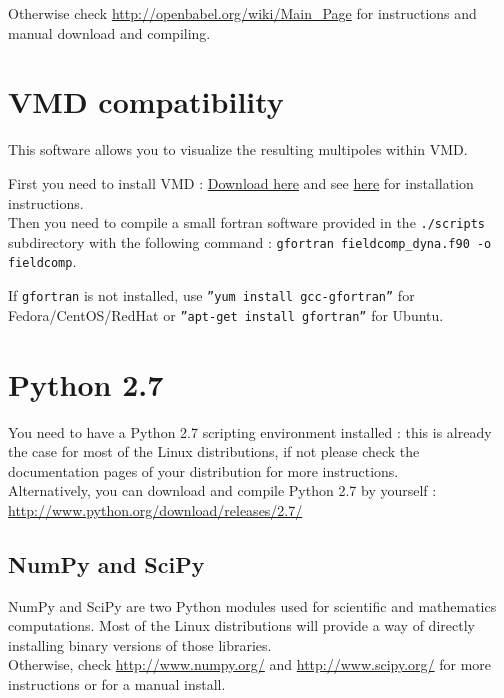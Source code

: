 \documentclass[11pt,a4paper]{article}
\begin{document}
Otherwise check 
\href{http://openbabel.org/wiki/Main_Page}{http://openbabel.org/wiki/Main\_Page}
 for instructions and manual download and compiling.

\section{VMD compatibility}
This software allows you to visualize the resulting multipoles within VMD.

First you need to install VMD : 
\href{http://www.ks.uiuc.edu/Development/Download/download.cgi?PackageName=VMD}{Download
 here} and see 
\href{http://www.ks.uiuc.edu/Research/vmd/current/docs.html}{here} for 
installation instructions.\\

Then you need to compile a small fortran software provided in the 
\texttt{./scripts} subdirectory with the following command : 
\texttt{gfortran fieldcomp\_dyna.f90 -o fieldcomp}.

If \texttt{gfortran} is not installed, use \texttt{''yum install 
gcc-gfortran''} for Fedora/CentOS/RedHat or \texttt{''apt-get install 
gfortran''} for Ubuntu.

\section{Python 2.7}
You need to have a Python 2.7 scripting environment installed : this is 
already the case for most of the Linux distributions, if not please check the 
documentation pages of your distribution for more instructions.\\

Alternatively, you can download and compile Python 2.7 by yourself :\\
\href{http://www.python.org/download/releases/2.7/}{http://www.python.org/download/releases/2.7/}

\subsection{NumPy and SciPy}

NumPy and SciPy are two Python modules used for scientific and mathematics 
computations. Most of the Linux distributions will provide a way of directly 
installing binary versions of those libraries.\\

Otherwise, check \href{http://www.numpy.org/}{http://www.numpy.org/} and 
\href{http://www.scipy.org/}{http://www.scipy.org/} for more instructions or 
for a manual install.
\end{document}
